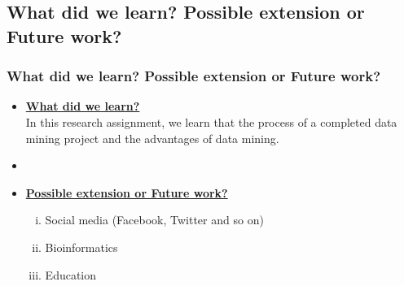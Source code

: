 \documentclass{beamer}
\begin{document}
\begin{frame}
\section{What did we learn? Possible extension or Future work?}
\frametitle{What did we learn? Possible extension or Future work?}
\begin{itemize}
\item[] \large \textbf{\underline{What did we learn?}} \\
In this research assignment, we learn that the process of a completed data mining project and the advantages of data mining.
\item[]
\item[] \large \textbf{\underline{Possible extension or Future work?}}
\begin{enumerate}[i.]
\item Social media (Facebook, Twitter and so on)
\item Bioinformatics
\item Education
\end{enumerate}
\end{itemize}
\end{frame}
\end{document}
